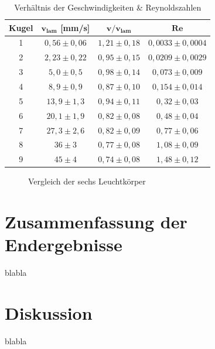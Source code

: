 \documentclass{article}
\begin{document}
\phantom{.}

\begin{table}[!h]
    \centering
    \begin{tabular}{cccc}
        \hline
        \textbf{Kugel} & $\bm{v_{lam}}$ [mm/s] & $\bm{v/v_{lam}}$ & $\bm{Re}$  \\ \hline
        1 & $0,56 \pm 0,06$ & $1,21 \pm 0,18$ & $0,0033 \pm 0,0004$     \\
        2 & $2,23 \pm 0,22$ & $0,95 \pm 0,15$ & $0,0209 \pm 0,0029$     \\
        3 & $5,0 \pm 0,5$   & $0,98 \pm 0,14$ & $0,073 \pm 0,009$     \\
        4 & $8,9 \pm 0,9$   & $0,87 \pm 0,10$ & $0,154 \pm 0,014$     \\
        5 & $13,9 \pm 1,3$  & $0,94 \pm 0,11$ & $0,32 \pm 0,03$     \\
        6 & $20,1 \pm 1,9$  & $0,82 \pm 0,08$ & $0,48 \pm 0,04$     \\
        7 & $27,3 \pm 2,6$  & $0,82 \pm 0,09$ & $0,77 \pm 0,06$     \\
        8 & $36 \pm 3$      & $0,77 \pm 0,08$ & $1,08 \pm 0,09$     \\
        9 & $45 \pm 4$      & $0,74 \pm 0,08$ & $1,48 \pm 0,12$     \\ \hline
    \end{tabular}%
    \caption{Verhältnis der Geschwindigkeiten \& Reynoldszahlen}
    \label{tab:v_lam&Re}
\end{table}

\phantom{.}

\begin{figure}[!h]
    \centering
    \caption{Vergleich der sechs Leuchtkörper}
    \label{fig:VglLeuchtkörper}
\end{figure}


\newpage
\section{Zusammenfassung der Endergebnisse}

blabla

\newpage
\section{Diskussion}

blabla

\newpage
%
\end{document}
